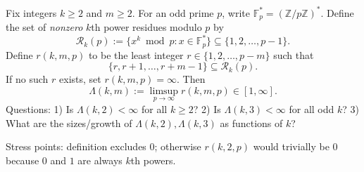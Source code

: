 Fix integers $k\ge 2$ and $m\ge 2$. For an odd prime $p$, write $\mathbb F_p^*=(\mathbb Z/p\mathbb Z)^*$.
Define the set of \emph{nonzero} $k$th power residues modulo $p$ by
\[
\mathcal R_k(p):=\{x^k\bmod p : x\in\mathbb F_p^*\}\subseteq\{1,2,\dots,p-1\}.
\]
Define $r(k,m,p)$ to be the least integer $r\in\{1,2,\dots,p-m\}$ such that
\[
\{r,r+1,\dots,r+m-1\}\subseteq \mathcal R_k(p).
\]
If no such $r$ exists, set $r(k,m,p)=\infty$. Then
\[
\Lambda(k,m):=\limsup_{p\to\infty} r(k,m,p)\in[1,\infty].
\]
Questions:
1) Is $\Lambda(k,2)<\infty$ for all $k\ge 2$?
2) Is $\Lambda(k,3)<\infty$ for all odd $k$?
3) What are the sizes/growth of $\Lambda(k,2),\Lambda(k,3)$ as functions of $k$?

Stress points: definition excludes $0$; otherwise $r(k,2,p)$ would trivially be $0$ because $0$ and $1$ are always $k$th powers.
